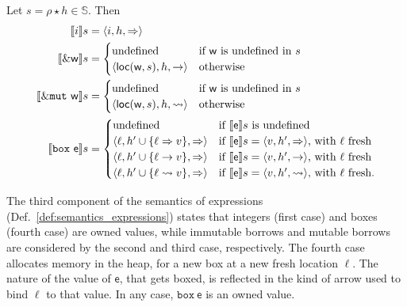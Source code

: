 \begin{definition}\label{def:semantics_expressions}
  Let $s=\rho\star h\in\mathbb{S}$. Then
  \begin{align*}
    \den[i]{s}&=\langle i,h,\Rightarrow\rangle\\
    \den[\borrow\mathsf{w}]{s}&=\begin{cases}
    \text{undefined} & \text{if $\mathsf{w}$ is undefined in $s$}\\
    \langle\loc(\mathsf{w},s),h,\to\rangle & \text{otherwise}
    \end{cases}\\
    \den[\mutborrow\mathsf{w}]{s}&=\begin{cases}
    \text{undefined} & \text{if $\mathsf{w}$ is undefined in $s$}\\
    \langle\loc(\mathsf{w},s),h,\leadsto\rangle & \text{otherwise}
    \end{cases}\\
    \den[\mathtt{box}\ \mathsf{e}]{s}&=
    \begin{cases}
      \text{undefined} & \text{if $\den[\mathsf{e}]{s}$ is undefined}\\
      \langle\ell,h'\cup\{\ell\Rightarrow v\},\Rightarrow\rangle & \text{if $\den[\mathsf{e}]{s}=\langle v, h',\Rightarrow\rangle$, with $\ell$ fresh}\\
      \langle\ell,h'\cup\{\ell\to v\},\Rightarrow\rangle & \text{if $\den[\mathsf{e}]{s}=\langle v, h',\to\rangle$, with $\ell$ fresh}\\
      \langle\ell,h'\cup\{\ell\leadsto v\},\Rightarrow\rangle & \text{if $\den[\mathsf{e}]{s}=\langle v, h',\leadsto\rangle$, with $\ell$ fresh.}
    \end{cases}
  \end{align*}
\end{definition}

\noindent
The third component of the semantics of expressions
(Def.~\ref{def:semantics_expressions}) states that integers (first case) and
boxes (fourth case) are owned values, while immutable borrows and mutable borrows
are considered by the second and third case, respectively. The fourth case allocates memory
in the heap, for a new box at a new fresh location $\ell$. The nature of the value of $\mathsf{e}$,
that gets boxed, is reflected in the kind of arrow used to bind $\ell$ to that value.
In any case, $\mathtt{box}\ \mathsf{e}$ is an owned value.

